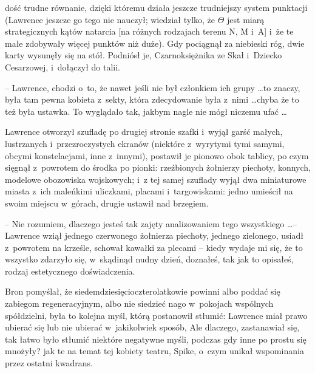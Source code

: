 \documentclass[oneside,polish,11pt,rmheadings]{mwbk}
\begin{document}




\medskip 
dość trudne równanie, dzięki któremu działa jeszcze trudniejszy system punktacji (Lawrence jeszcze go tego nie nauczył; wiedział tylko, że $\Theta$ jest miarą strategicznych kątów natarcia [na różnych rodzajach terenu N, M i~A] i~że te małe zdobywały więcej punktów niż duże).  Gdy pociągnął za niebieski róg, dwie karty wysunęły się na stół. Podniósł je, Czarnoksiężnika ze Skał i~Dziecko Cesarzowej, i~dołączył do talii.  

-- Lawrence, chodzi o~to, że nawet jeśli nie był członkiem ich grupy \ldots  to znaczy, była tam pewna kobieta z~sekty, która zdecydowanie była z~nimi \ldots  chyba że to też była ustawka. To wyglądało tak, jakbym nagle nie mógł niczemu ufać \ldots  

Lawrence otworzył szufladę po drugiej stronie szafki i~wyjął garść małych, lustrzanych i~przezroczystych ekranów (niektóre z~wyrytymi tymi samymi, obcymi konstelacjami, inne z~innymi), postawił je pionowo obok tablicy, po czym sięgnął z~powrotem do środka po pionki: rzeźbionych żołnierzy piechoty, konnych, modelowe obozowiska wojskowych; i~z tej samej szuflady wyjął dwa miniaturowe miasta z~ich maleńkimi uliczkami, placami i~targowiskami: jedno umieścił na swoim miejscu w~górach, drugie ustawił nad brzegiem. 

-- Nie rozumiem, dlaczego jesteś tak zajęty analizowaniem tego wszystkiego \ldots  -- Lawrence wziął jednego czerwonego żołnierza piechoty, jednego zielonego, usiadł z~powrotem na krześle, schował kawałki za plecami -- kiedy wydaje mi się, że to wszystko zdarzyło się, w~skądinąd nudny dzień, doznałeś, tak jak to opisałeś, rodzaj estetycznego doświadczenia.  

Bron pomyślał, że siedemdziesięcioczterolatkowie powinni albo poddać się zabiegom regeneracyjnym, albo nie siedzieć nago w~pokojach wspólnych spółdzielni, była to kolejna myśl, którą postanowił stłumić: Lawrence miał prawo ubierać się lub nie ubierać w~jakikolwiek sposób,  Ale dlaczego, zastanawiał się, tak łatwo było stłumić niektóre negatywne myśli, podczas gdy inne po prostu się mnożyły? jak te na temat tej kobiety teatru, Spike, o~czym unikał wspominania przez ostatni kwadrans. 
\end{document}
